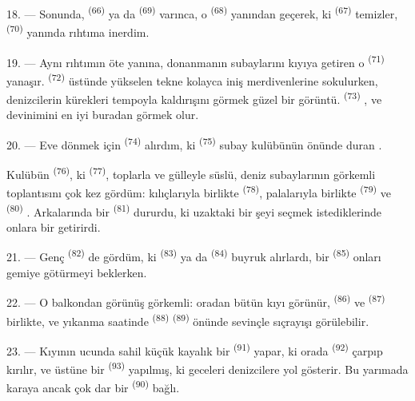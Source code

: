 18. --- Sonunda,  \textsuperscript{(66)} ya da
 \textsuperscript{(69)} varınca, o 
\textsuperscript{(68)} yanından geçerek, ki 
\textsuperscript{(67)} temizler, 
\textsuperscript{(70)} yanında rıhtıma inerdim.

19. --- Aynı rıhtımın öte yanına, donanmanın subaylarını kıyıya getiren o
 \textsuperscript{(71)} yanaşır. 
\textsuperscript{(72)} üstünde yükselen tekne kolayca iniş merdivenlerine
sokulurken, denizcilerin kürekleri tempoyla kaldırışını görmek güzel bir
görüntü.  \textsuperscript{(73)} , ve
  devinimini en iyi buradan görmek olur.

\VUsaut{3.0mm}
\VUsaut{3.0mm}

20. --- Eve dönmek için  \textsuperscript{(74)}
alırdım, ki  \textsuperscript{(75)} subay kulübünün önünde
duran .

Kulübün  \textsuperscript{(76)}, ki 
\textsuperscript{(77)}, toplarla ve gülleyle süslü, deniz subaylarının
görkemli toplantısını çok kez gördüm: kılıçlarıyla birlikte
 \textsuperscript{(78)}, palalarıyla birlikte
 \textsuperscript{(79)} ve 
\textsuperscript{(80)} . Arkalarında bir 
\textsuperscript{(81)} dururdu, ki uzaktaki bir şeyi seçmek istediklerinde
onlara bir  getirirdi.

21. --- Genç  \textsuperscript{(82)} de gördüm, ki
 \textsuperscript{(83)} ya da 
\textsuperscript{(84)} buyruk alırlardı, bir 
\textsuperscript{(85)} onları gemiye götürmeyi beklerken.

22. --- O balkondan görünüş görkemli: oradan bütün kıyı görünür,
 \textsuperscript{(86)} ve  \textsuperscript{(87)} birlikte, ve yıkanma saatinde
 \textsuperscript{(88)} 
\textsuperscript{(89)} önünde sevinçle sıçrayışı görülebilir.

23. --- Kıyının ucunda sahil küçük kayalık bir 
\textsuperscript{(91)} yapar, ki orada 
\textsuperscript{(92)} çarpıp kırılır, ve üstüne bir 
\textsuperscript{(93)} yapılmış, ki geceleri denizcilere yol gösterir. Bu
yarımada karaya ancak çok dar bir  \textsuperscript{(90)}
bağlı.

